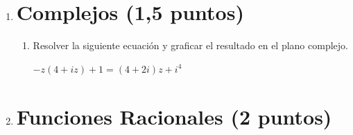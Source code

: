 \documentclass[a4paper,11pt,spanish,sans]{exam}
\begin{document}
\begin{enumerate}

\item  \section*{Complejos (1,5 puntos)}

\begin{enumerate}
	\item Resolver la siguiente ecuación y graficar el resultado en el plano complejo.
	
	$-z(4+iz)+1=(4+2i)z+i^4$

\end{enumerate}
	
\item \section*{Funciones Racionales (2 puntos)}


\end{enumerate}
\end{document}
